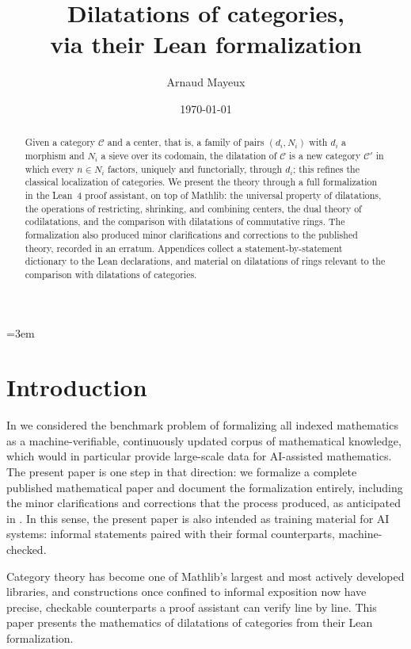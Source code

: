 \documentclass[11pt]{amsart}
\title[Dilatations of categories, via their Lean formalization]{Dilatations of categories,\\ via their Lean formalization}
\author{Arnaud Mayeux}
\date{\today}
\theoremstyle{plain}
\theoremstyle{definition}
\theoremstyle{remark}
\newcommand{\calC}{\mathcal C}
\begin{document}
\emergencystretch=3em
\maketitle

\begin{abstract}
Given a category $\calC$ and a center, that is, a family of pairs $(d_i, N_i)$ with $d_i$ a
morphism and $N_i$ a sieve over its codomain, the dilatation of $\calC$ is a new category
$\calC'$ in which every $n \in N_i$ factors, uniquely and functorially, through $d_i$; this
refines the classical localization of categories. We present the theory through a full
formalization in the Lean~4 proof assistant, on top of Mathlib: the universal property of
dilatations, the operations of restricting, shrinking, and combining centers, the dual
theory of codilatations, and the comparison with dilatations of commutative rings. The
formalization also produced minor clarifications and corrections to the published theory,
recorded in an erratum. Appendices collect a statement-by-statement dictionary to the Lean
declarations, and material on dilatations of rings relevant to the comparison with
dilatations of categories.
\end{abstract}

\setcounter{tocdepth}{1}
\tableofcontents

\section{Introduction}
\label{sec:intro}

In \citep{MayDil} we considered the benchmark problem of formalizing all indexed
mathematics as a machine-verifiable, continuously updated corpus of mathematical
knowledge, which would in particular provide large-scale data for AI-assisted
mathematics. The present paper is one step in that direction: we formalize a complete
published mathematical paper and document the formalization entirely, including the
minor clarifications and corrections that the process produced, as anticipated in
\citep[\S 5.6]{MayDil}. In this sense, the present paper is also intended as training
material for AI systems: informal statements paired with their formal counterparts,
machine-checked.

Category theory has become one of Mathlib's largest and most actively developed libraries,
and constructions once confined to informal exposition now have precise, checkable counterparts a proof
assistant can verify line by line. This paper presents the mathematics of dilatations of
categories from their Lean formalization.
\end{document}
